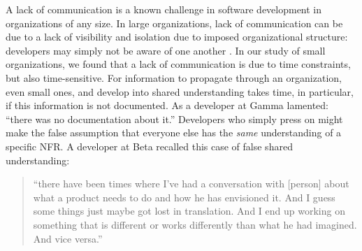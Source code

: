 \documentclass[smallextended]{svjour3}
\begin{document}
A lack of communication is a known challenge in software development in organizations of any size. 
In large organizations, lack of communication can be due to a lack of visibility and isolation due to imposed organizational structure: developers may simply not be aware of one another \citep{stol2014key}. In our study of small organizations, we found that a lack of communication is due to time constraints, but also time-sensitive. 
For information to propagate through an organization, even small ones, and develop into shared understanding takes time, in particular, if this information is not documented. As a developer at Gamma lamented:
\textmd{``there was no documentation about it.''}
Developers who simply press on might make the false assumption that everyone else has the \emph{same} understanding of a specific NFR. A developer at Beta recalled this case of false shared understanding:
\begin{quote}
    ``there have been times where I've had a conversation with [person] about what a product needs to do and how he has envisioned it. And I guess some things just maybe got lost in translation. And I end up working on something that is different or works differently than what he had imagined. And vice versa.''
\end{quote}    
  
\end{document}
